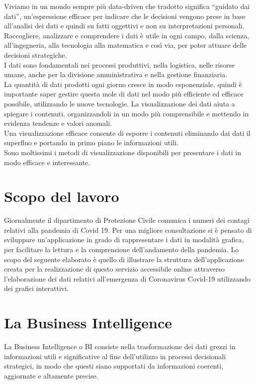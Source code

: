 
Viviamo in un mondo sempre più data-driven che tradotto significa “guidato dai dati”, un’espressione efficace per indicare che le decisioni vengono prese in base all’analisi dei dati e quindi su fatti oggettivi e non su interpretazioni personali.
Raccogliere, analizzare e comprendere i dati è utile in ogni campo, dalla scienza, all'ingegneria, alla tecnologia alla matematica e così via, per poter attuare delle decisioni strategiche.\\
I dati sono fondamentali nei processi produttivi, nella logistica, nelle risorse umane, anche per la divisione amministrativa e nella gestione finanziaria.\\
La quantità di dati prodotti ogni giorno cresce in modo esponenziale, quindi è importante saper gestire questa mole di dati nel modo più efficiente ed efficace possibile, utilizzando le nuove tecnologie.
La visualizzazione dei dati aiuta a spiegare i contenuti, organizzandoli in un modo più comprensibile e mettendo in evidenza tendenze e valori anomali.\\
Una visualizzazione efficace consente di esporre i contenuti eliminando dai dati il superfluo e portando in primo piano le informazioni utili.\\
Sono moltissimi i metodi di visualizzazione disponibili per presentare i dati in modo efficace e interessante.


\section{Scopo del lavoro}

Giornalmente il dipartimento di Protezione Civile comunica i numeri dei contagi relativi alla pandemia di Covid 19.
Per una migliore consultazione si è pensato di sviluppare un’applicazione in grado di rappresentare i dati in modalità grafica, per facilitare la lettura e la comprensione dell’andamento della pandemia.
Lo scopo del seguente elaborato è quello di illustrare la struttura dell'applicazione creata per la realizzazione di questo servizio accessibile online attraverso l’elaborazione dei dati relativi all’emergenza di Coronavirus Covid-19 utilizzando dei grafici interattivi.

\section{La Business Intelligence}
La Business Intelligence o BI consiste nella trasformazione dei dati grezzi in informazioni utili e significative al fine dell’utilizzo in processi decisionali strategici, in modo che questi siano supportati da informazioni coerenti, aggiornate e altamente precise.
 
